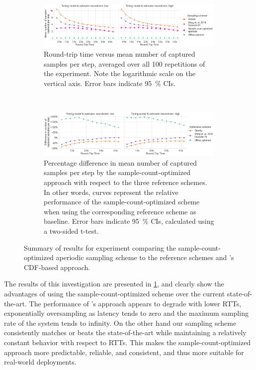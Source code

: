 \begin{figure}
    \centering
    \begin{subfigure}[t]{\textwidth}
        \centering
        \includegraphics[width=\textwidth]{figs/new_model/sampling_optimization.png}
        \caption{%
            Round-trip time versus mean number of captured samples per step, averaged over all \num{100} repetitions of the experiment.
            Note the logarithmic scale on the vertical axis.
            Error bars indicate \SI{95}{\percent} \acp{CI}.
        }
    \end{subfigure}\\
    \medskip
    \begin{subfigure}[t]{\textwidth}
        \centering
        \includegraphics[width=\textwidth]{figs/new_model/sampling_optimization_diff.png}
        \caption{%
            Percentage difference in mean number of captured samples per step by the sample-count-optimized approach with respect to the three reference schemes.
            In other words, curves represent the relative performance of the sample-count-optimized scheme when using the corresponding reference scheme as baseline.
            Error bars indicate \SI{95}{\percent} \acp{CI}, calculated using a two-sided t-test.
        }
    \end{subfigure}
    \caption{%
        Summary of results for experiment comparing the sample-count-optimized aperiodic sampling scheme to the reference schemes and \textcite{Wang2019Towards}'s \ac{CDF}-based approach.
    }\label{fig:optimization:samples}
\end{figure}

The results of this investigation are presented in \cref{fig:optimization:samples}, and clearly show the advantages of using the sample-count-optimized scheme over the current state-of-the-art.
The performance of \textcite{Wang2019Towards}'s approach appears to degrade with lower \acp{RTT}, exponentially oversampling as latency tends to zero and the maximum sampling rate of the system tends to infinity.
On the other hand our sampling scheme consistently matches or beats the state-of-the-art while maintaining a relatively constant behavior with respect to \acp{RTT}.
This makes the sample-count-optimized approach more predictable, reliable, and consistent, and thus more suitable for real-world deployments.

